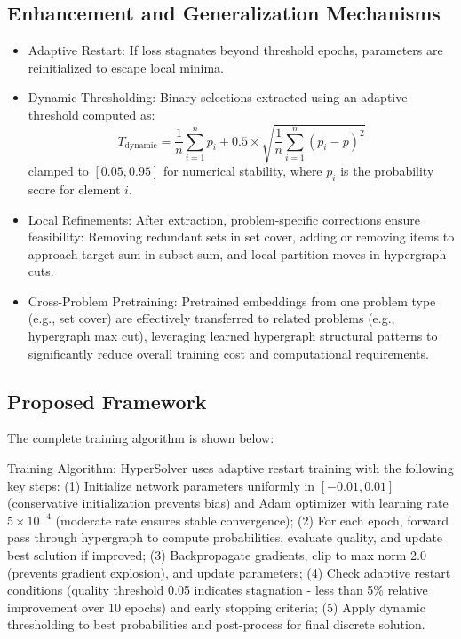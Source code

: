 \documentclass[conference]{IEEEtran}
\begin{document}
\subsection{Enhancement and Generalization Mechanisms}
\begin{itemize}
  \item Adaptive Restart: If loss stagnates beyond threshold epochs, parameters are reinitialized to escape local minima.
  \item Dynamic Thresholding: Binary selections extracted using an adaptive threshold computed as:
  \[
  T_{\text{dynamic}} = \frac{1}{n}\sum_{i=1}^{n} p_i + 0.5 \times \sqrt{\frac{1}{n}\sum_{i=1}^{n} (p_i - \bar{p})^2}
  \]
  clamped to \([0.05, 0.95]\) for numerical stability, where \(p_i\) is the probability score for element \(i\).
  \item Local Refinements: After extraction, problem-specific corrections ensure feasibility: Removing redundant sets in set cover, adding or removing items to approach target sum in subset sum, and local partition moves in hypergraph cuts.
  \item Cross-Problem Pretraining: Pretrained embeddings from one problem type (e.g., set cover) are effectively transferred to related problems (e.g., hypergraph max cut), leveraging learned hypergraph structural patterns to significantly reduce overall training cost and computational requirements.
\end{itemize}

\subsection{Proposed Framework}

The complete training algorithm is shown below:

Training Algorithm: HyperSolver uses adaptive restart training with the following key steps: (1) Initialize network parameters uniformly in \([-0.01, 0.01]\) (conservative initialization prevents bias) and Adam optimizer with learning rate \(5 \times 10^{-4}\) (moderate rate ensures stable convergence); (2) For each epoch, forward pass through hypergraph to compute probabilities, evaluate quality, and update best solution if improved; (3) Backpropagate gradients, clip to max norm 2.0 (prevents gradient explosion), and update parameters; (4) Check adaptive restart conditions (quality threshold 0.05 indicates stagnation - less than 5\% relative improvement over 10 epochs) and early stopping criteria; (5) Apply dynamic thresholding to best probabilities and post-process for final discrete solution.
\end{document}
